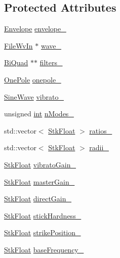 \subsection*{Protected Attributes}
\begin{DoxyCompactItemize}
\item 
\hyperlink{class_nyq_1_1_envelope}{Envelope} \hyperlink{class_nyq_1_1_modal_a844c10129c54c42b33a2bce8f0dd774f}{envelope\+\_\+}
\item 
\hyperlink{class_nyq_1_1_file_wv_in}{File\+Wv\+In} $\ast$ \hyperlink{class_nyq_1_1_modal_af0d1dc63ba1d78d89220f6e4db12b3f2}{wave\+\_\+}
\item 
\hyperlink{class_nyq_1_1_bi_quad}{Bi\+Quad} $\ast$$\ast$ \hyperlink{class_nyq_1_1_modal_ad42ee6521b8cd8d9928b198d8ae8e220}{filters\+\_\+}
\item 
\hyperlink{class_nyq_1_1_one_pole}{One\+Pole} \hyperlink{class_nyq_1_1_modal_a8e450a91ab3d648dc0fa7f2cebe39128}{onepole\+\_\+}
\item 
\hyperlink{class_nyq_1_1_sine_wave}{Sine\+Wave} \hyperlink{class_nyq_1_1_modal_ab5a89e0aab6a8710bb8e8c3e71882f66}{vibrato\+\_\+}
\item 
unsigned \hyperlink{xmltok_8h_a5a0d4a5641ce434f1d23533f2b2e6653}{int} \hyperlink{class_nyq_1_1_modal_a6f8e4e25d265910c88565909fe27ebf0}{n\+Modes\+\_\+}
\item 
std\+::vector$<$ \hyperlink{namespace_nyq_a044fa20a706520a617bbbf458a7db7e4}{Stk\+Float} $>$ \hyperlink{class_nyq_1_1_modal_ab7c2e81d6ba5f9c427e33188ad530286}{ratios\+\_\+}
\item 
std\+::vector$<$ \hyperlink{namespace_nyq_a044fa20a706520a617bbbf458a7db7e4}{Stk\+Float} $>$ \hyperlink{class_nyq_1_1_modal_a2609b51fb75b92ad347713dc29e0750c}{radii\+\_\+}
\item 
\hyperlink{namespace_nyq_a044fa20a706520a617bbbf458a7db7e4}{Stk\+Float} \hyperlink{class_nyq_1_1_modal_af45d3067a2cce0a33d90ca5e732b99ab}{vibrato\+Gain\+\_\+}
\item 
\hyperlink{namespace_nyq_a044fa20a706520a617bbbf458a7db7e4}{Stk\+Float} \hyperlink{class_nyq_1_1_modal_aa2acc0d2e3b672742b74b6de517a107a}{master\+Gain\+\_\+}
\item 
\hyperlink{namespace_nyq_a044fa20a706520a617bbbf458a7db7e4}{Stk\+Float} \hyperlink{class_nyq_1_1_modal_a7826b03a9386d56c01db8366ec5ed54f}{direct\+Gain\+\_\+}
\item 
\hyperlink{namespace_nyq_a044fa20a706520a617bbbf458a7db7e4}{Stk\+Float} \hyperlink{class_nyq_1_1_modal_a6321b5df870afb014940d1821988c74a}{stick\+Hardness\+\_\+}
\item 
\hyperlink{namespace_nyq_a044fa20a706520a617bbbf458a7db7e4}{Stk\+Float} \hyperlink{class_nyq_1_1_modal_ad99368946b0a16904d117f637534f7c4}{strike\+Position\+\_\+}
\item 
\hyperlink{namespace_nyq_a044fa20a706520a617bbbf458a7db7e4}{Stk\+Float} \hyperlink{class_nyq_1_1_modal_ab81334074fbb555f5c527623d823c89c}{base\+Frequency\+\_\+}
\end{DoxyCompactItemize}
